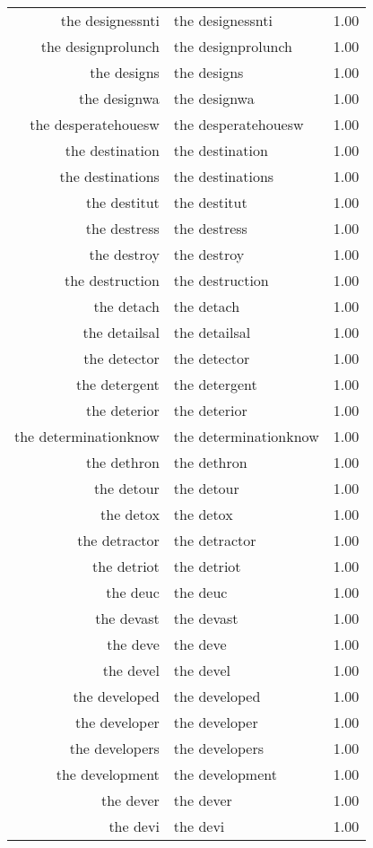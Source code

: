 \begin{table}[ht]
\begin{tabular}{rlr}
  the designessnti & the designessnti & 1.00 \\ 
  the designprolunch & the designprolunch & 1.00 \\ 
  the designs & the designs & 1.00 \\ 
  the designwa & the designwa & 1.00 \\ 
  the desperatehouesw & the desperatehouesw & 1.00 \\ 
  the destination & the destination & 1.00 \\ 
  the destinations & the destinations & 1.00 \\ 
  the destitut & the destitut & 1.00 \\ 
  the destress & the destress & 1.00 \\ 
  the destroy & the destroy & 1.00 \\ 
  the destruction & the destruction & 1.00 \\ 
  the detach & the detach & 1.00 \\ 
  the detailsal & the detailsal & 1.00 \\ 
  the detector & the detector & 1.00 \\ 
  the detergent & the detergent & 1.00 \\ 
  the deterior & the deterior & 1.00 \\ 
  the determinationknow & the determinationknow & 1.00 \\ 
  the dethron & the dethron & 1.00 \\ 
  the detour & the detour & 1.00 \\ 
  the detox & the detox & 1.00 \\ 
  the detractor & the detractor & 1.00 \\ 
  the detriot & the detriot & 1.00 \\ 
  the deuc & the deuc & 1.00 \\ 
  the devast & the devast & 1.00 \\ 
  the deve & the deve & 1.00 \\ 
  the devel & the devel & 1.00 \\ 
  the developed & the developed & 1.00 \\ 
  the developer & the developer & 1.00 \\ 
  the developers & the developers & 1.00 \\ 
  the development & the development & 1.00 \\ 
  the dever & the dever & 1.00 \\ 
  the devi & the devi & 1.00 \\ 

\end{tabular}
\end{table}
